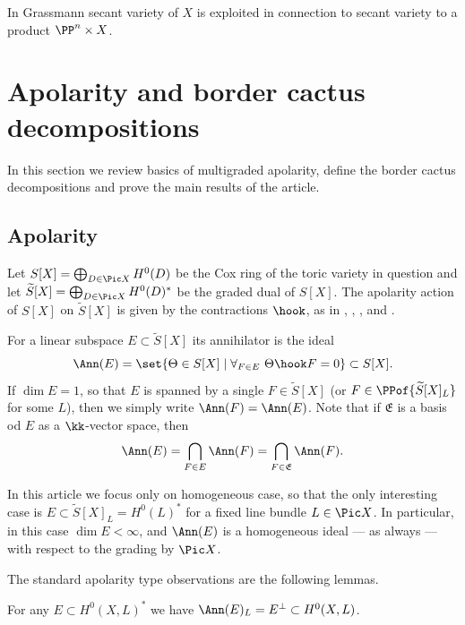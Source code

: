 \documentclass[12pt,a4paper]{article}
\begin{document}
In \cite{landsberg_jabu_ranks_of_tensors} Grassmann secant variety of $X$ is exploited in connection to
secant variety to a product $\PP^{n}\times X$.

\section{Apolarity and border cactus decompositions}

In this section we review basics of multigraded apolarity, define the border cactus decompositions and prove the main results of the article.

\subsection{Apolarity}\label{sec_apolarity}
Let $S[X] = \bigoplus_{D\in \Pic X} H^0(D)$ be the Cox ring of the toric variety in question and let $\widetilde{S}[X] = \bigoplus_{D\in \Pic X} H^0(D)^*$ be the graded dual of $S[X]$.
The apolarity action of $S[X]$ on $\widetilde{S}[X]$ is given by
the contractions $\hook$, as in \cite[\S3.1]{jelisiejew_PhD},
\cite[Equation (1.1) and \S4]{galazka_mgr_publ}, \cite[\S3.1]{nisiabu_jabu_border_apolarity}, and \cite[\S5.1]{jabu_keneshlou_cactus_scheme}.

For a linear subspace $E\subset \widetilde{S}[X]$ its annihilator is the ideal
\[
 \Ann(E) = \set{\Theta \in S[X] \mid \forall_{F\in E} \ \Theta \hook F = 0  } \subset S[X].
\]
If $\dim E= 1$, so that $E$ is spanned by a single $F\in \widetilde{S}[X]$ (or $F\in \PPof{\widetilde{S}[X]_L}$ for some $L$), then we simply write $\Ann(F) = \Ann(E)$.
Note that if $\mathfrak{E}$ is a basis od $E$ as a $\kk$-vector space, then
\[
   \Ann(E) = \bigcap_{F\in E} \Ann(F) = \bigcap_{F\in \mathfrak{E}} \Ann(F).
\]

In this article we focus only on homogeneous case, so that the only interesting case is $E\subset \widetilde{S}[X]_L = H^0(L)^*$ for
a fixed line bundle $L\in \Pic X$. In particular, in this case $\dim E < \infty$, and $\Ann(E)$ is a homogeneous ideal
--- as always ---  with respect to the grading by $\Pic X$.

The standard apolarity type observations are the following lemmas.
\begin{lemma} \label{lem_annihilator_and_perp}
  For any $E\subset H^0(X,L)^*$
    we have $\Ann(E)_{L} = E^{\perp} \subset H^0(X,L)$.
\end{lemma}
\end{document}
